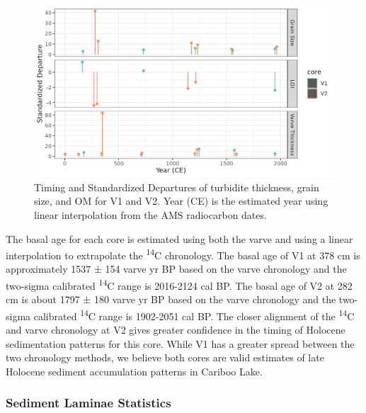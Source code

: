 \documentclass[Royal,times,doublespace,sageh]{sagej}
\begin{document}
\begin{figure}

{\centering \includegraphics[width=1\linewidth]{figs/turbidite_plot} 

}

\caption{Timing and Standardized Departures of turbidite thickness, grain size, and OM for V1 and V2. Year (CE) is the estimated year using linear interpolation from the AMS radiocarbon dates.\label{turbScatter}}\label{fig:turbScatter}
\end{figure}

The basal age for each core is estimated using both the varve and using
a linear interpolation to extrapolate the \textsuperscript{14}C
chronology. The basal age of V1 at 378 cm is approximately 1537 ± 154
varve yr BP based on the varve chronology and the two-sigma calibrated
\textsuperscript{14}C range is 2016-2124 cal BP. The basal age of V2 at
282 cm is about 1797 ± 180 varve yr BP based on the varve chronology and
the two-sigma calibrated \textsuperscript{14}C range is 1902-2051 cal
BP. The closer alignment of the \textsuperscript{14}C and varve
chronology at V2 gives greater confidence in the timing of Holocene
sedimentation patterns for this core. While V1 has a greater spread
between the two chronology methods, we believe both cores are valid
estimates of late Holocene sediment accumulation patterns in Cariboo
Lake.

\hypertarget{sediment-laminae-statistics}{%
\subsubsection{Sediment Laminae
Statistics}\label{sediment-laminae-statistics}}
\end{document}
